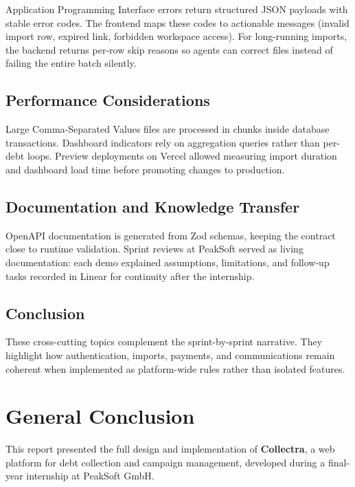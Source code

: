 \documentclass[12pt,a4paper]{report}
\begin{document}
Application Programming Interface errors return structured JSON payloads with stable error codes.
The frontend maps these codes to actionable messages (invalid import row, expired link,
forbidden workspace access).
For long-running imports, the backend returns per-row skip reasons so agents can correct files
instead of failing the entire batch silently.

\section{Performance Considerations}

Large Comma-Separated Values files are processed in chunks inside database transactions.
Dashboard indicators rely on aggregation queries rather than per-debt loops.
Preview deployments on Vercel allowed measuring import duration and dashboard load time before
promoting changes to production.

\section{Documentation and Knowledge Transfer}

OpenAPI documentation is generated from Zod schemas, keeping the contract close to runtime
validation.
Sprint reviews at PeakSoft served as living documentation: each demo explained assumptions,
limitations, and follow-up tasks recorded in Linear for continuity after the internship.

\section*{Conclusion}
{}

These cross-cutting topics complement the sprint-by-sprint narrative.
They highlight how authentication, imports, payments, and communications remain coherent when
implemented as platform-wide rules rather than isolated features.

\chapter*{General Conclusion}
{}

This report presented the full design and implementation of \textbf{Collectra}, a
web platform for debt collection and campaign management, developed during a
final-year internship at PeakSoft GmbH.
\end{document}
